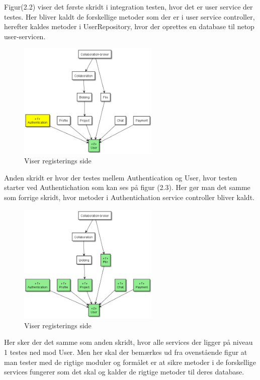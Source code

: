 Figur(2.2) viser det første skridt i integration testen, hvor det er user service der testes. Her bliver kaldt de forskellige metoder som der er i user service controller, herefter kaldes metoder i UserRepository, hvor der oprettes en database til netop user-servicen. 


\begin{figure}[ht]
    \centering
\includegraphics[width=0.6\textwidth]{integrationstest-image/step_2_dependencieTree.png}
\caption{Viser registerings side}
\label{fig:figure2}
\end{figure}

Anden skridt er hvor der testes mellem Authentication og User, hvor testen starter ved Authentichation som kan ses på figur (2.3). Her gør man det samme som forrige skridt, hvor metoder i Authentichation service controller bliver kaldt.  

\newpage
\begin{figure}[ht]
    \centering
\includegraphics[width=0.6\textwidth]{integrationstest-image/step_3_dependencieTree.png}
\caption{Viser registerings side}
\label{fig:figure2}
\end{figure}

Her sker der det samme som anden skridt, hvor alle services der ligger på niveau 1 testes ned mod User. Men her skal der bemærkes ud fra ovenstående figur at man tester med de rigtige moduler og formålet er at sikre metoder i de forskellige services fungerer som det skal og kalder de rigtige metoder til deres database.  


